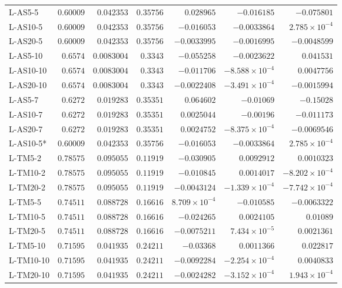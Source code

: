 \begin{longtable}{lrrrrrr}
L-AS5-5 & $0.60009$ & $0.042353$ & $0.35756$ & $0.028965$ & $-0.016185$ & $-0.075801$ \\
L-AS10-5 & $0.60009$ & $0.042353$ & $0.35756$ & $-0.016053$ & $-0.0033864$ & $2.785\times 10^{-4}$ \\
L-AS20-5 & $0.60009$ & $0.042353$ & $0.35756$ & $-0.0033995$ & $-0.0016995$ & $-0.0048599$ \\
L-AS5-10 & $0.6574$ & $0.0083004$ & $0.3343$ & $-0.055258$ & $-0.0023622$ & $0.041531$ \\
L-AS10-10 & $0.6574$ & $0.0083004$ & $0.3343$ & $-0.011706$ & $-8.588\times 10^{-4}$ & $0.0047756$ \\
L-AS20-10 & $0.6574$ & $0.0083004$ & $0.3343$ & $-0.0022408$ & $-3.491\times 10^{-4}$ & $-0.0015994$ \\
L-AS5-7 & $0.6272$ & $0.019283$ & $0.35351$ & $0.064602$ & $-0.01069$ & $-0.15028$ \\
L-AS10-7 & $0.6272$ & $0.019283$ & $0.35351$ & $0.0025044$ & $-0.00196$ & $-0.011173$ \\
L-AS20-7 & $0.6272$ & $0.019283$ & $0.35351$ & $0.0024752$ & $-8.375\times 10^{-4}$ & $-0.0069546$ \\
L-AS10-5* & $0.60009$ & $0.042353$ & $0.35756$ & $-0.016053$ & $-0.0033864$ & $2.785\times 10^{-4}$ \\
L-TM5-2 & $0.78575$ & $0.095055$ & $0.11919$ & $-0.030905$ & $0.0092912$ & $0.0010323$ \\
L-TM10-2 & $0.78575$ & $0.095055$ & $0.11919$ & $-0.010845$ & $0.0014017$ & $-8.202\times 10^{-4}$ \\
L-TM20-2 & $0.78575$ & $0.095055$ & $0.11919$ & $-0.0043124$ & $-1.339\times 10^{-4}$ & $-7.742\times 10^{-4}$ \\
L-TM5-5 & $0.74511$ & $0.088728$ & $0.16616$ & $8.709\times 10^{-4}$ & $-0.010585$ & $-0.0063322$ \\
L-TM10-5 & $0.74511$ & $0.088728$ & $0.16616$ & $-0.024265$ & $0.0024105$ & $0.01089$ \\
L-TM20-5 & $0.74511$ & $0.088728$ & $0.16616$ & $-0.0075211$ & $7.434\times 10^{-5}$ & $0.0021361$ \\
L-TM5-10 & $0.71595$ & $0.041935$ & $0.24211$ & $-0.03368$ & $0.0011366$ & $0.022817$ \\
L-TM10-10 & $0.71595$ & $0.041935$ & $0.24211$ & $-0.0092284$ & $-2.254\times 10^{-4}$ & $0.0040833$ \\
L-TM20-10 & $0.71595$ & $0.041935$ & $0.24211$ & $-0.0024282$ & $-3.152\times 10^{-4}$ & $1.943\times 10^{-4}$ \\

\end{longtable}
